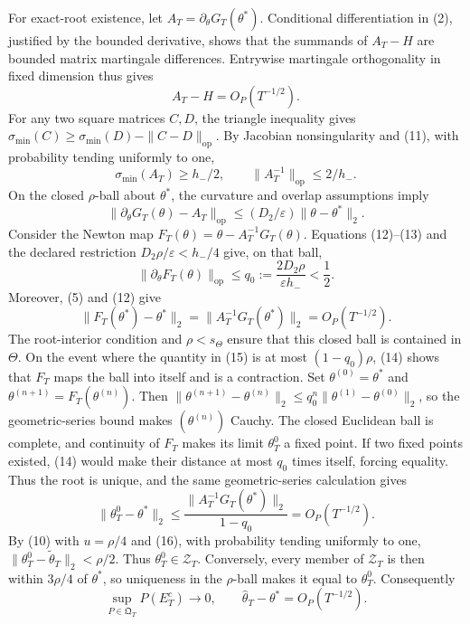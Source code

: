 For exact-root existence, let \(A_T=\partial_\theta G_T(\theta^*)\). Conditional differentiation in (2), justified by the bounded derivative, shows that the summands of \(A_T-H\) are bounded matrix martingale differences. Entrywise martingale orthogonality in fixed dimension thus gives
\[
 A_T-H=O_P(T^{-1/2}).
\tag{11}
\]
For any two square matrices \(C,D\), the triangle inequality gives \(\sigma_{\min}(C)\ge\sigma_{\min}(D)-\|C-D\|_{\mathrm{op}}\). By Jacobian nonsingularity and (11), with probability tending uniformly to one,
\[
 \sigma_{\min}(A_T)\ge h_-/2,
 \qquad \|A_T^{-1}\|_{\mathrm{op}}\le2/h_-.
\tag{12}
\]
On the closed \(\rho\)-ball about \(\theta^*\), the curvature and overlap assumptions imply
\[
 \|\partial_\theta G_T(\theta)-A_T\|_{\mathrm{op}}
 \le (D_2/\varepsilon)\|\theta-\theta^*\|_2.
\tag{13}
\]
Consider the Newton map \(F_T(\theta)=\theta-A_T^{-1}G_T(\theta)\). Equations (12)--(13) and the declared restriction \(D_2\rho/\varepsilon<h_-/4\) give, on that ball,
\[
 \|\partial_\theta F_T(\theta)\|_{\mathrm{op}}
 \le q_0:=\frac{2D_2\rho}{\varepsilon h_-}<\frac12.
\tag{14}
\]
Moreover, (5) and (12) give
\[
 \|F_T(\theta^*)-\theta^*\|_2
 =\|A_T^{-1}G_T(\theta^*)\|_2=O_P(T^{-1/2}).
\tag{15}
\]
The root-interior condition and \(\rho<s_\Theta\) ensure that this closed ball is contained in \(\Theta\). On the event where the quantity in (15) is at most \((1-q_0)\rho\), (14) shows that \(F_T\) maps the ball into itself and is a contraction. Set \(\theta^{(0)}=\theta^*\) and \(\theta^{(n+1)}=F_T(\theta^{(n)})\). Then \(\|\theta^{(n+1)}-\theta^{(n)}\|_2\le q_0^n\|\theta^{(1)}-\theta^{(0)}\|_2\), so the geometric-series bound makes \((\theta^{(n)})\) Cauchy. The closed Euclidean ball is complete, and continuity of \(F_T\) makes its limit \(\theta_T^0\) a fixed point. If two fixed points existed, (14) would make their distance at most \(q_0\) times itself, forcing equality. Thus the root is unique, and the same geometric-series calculation gives
\[
 \|\theta_T^0-\theta^*\|_2
 \le\frac{\|A_T^{-1}G_T(\theta^*)\|_2}{1-q_0}
 =O_P(T^{-1/2}).
\tag{16}
\]
By (10) with \(u=\rho/4\) and (16), with probability tending uniformly to one, \(\|\theta_T^0-\widetilde\theta_T\|_2<\rho/2\). Thus \(\theta_T^0\in\mathcal Z_T\). Conversely, every member of \(\mathcal Z_T\) is then within \(3\rho/4\) of \(\theta^*\), so uniqueness in the \(\rho\)-ball makes it equal to \(\theta_T^0\). Consequently
\[
 \sup_{P\in\mathfrak Q_T}P(E_T^c)\longrightarrow0,
 \qquad \widehat\theta_T-\theta^*=O_P(T^{-1/2}).
\tag{17}
\]

